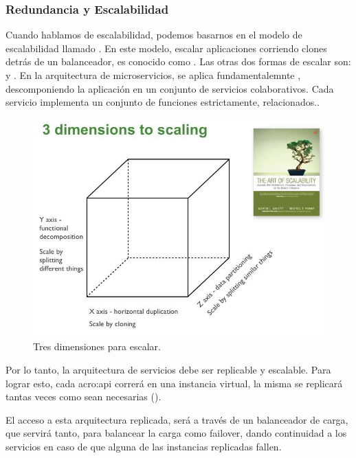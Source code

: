 \subsubsection{Redundancia y Escalabilidad}


Cuando hablamos de escalabilidad, podemos basarnos en el modelo de escalabilidad llamado .
En este modelo, escalar aplicaciones corriendo clones detrás de un balanceador, es conocido como .  Las otras dos formas de escalar son:  y .
En la arquitectura de microservicios, se aplica fundamentalemnte , descomponiendo la aplicación en un conjunto de servicios colaborativos.  Cada servicio implementa un conjunto de funciones estrictamente, relacionados.\cite{website:akfpartners-scale-cube}.

\begin{figure}
  \includegraphics[width=\linewidth]{src/images/03-capitulo-3/scale_cube.jpg}
  \caption{Tres dimensiones para escalar.}
  \label{fig:scale-cube}
\end{figure}

Por lo tanto, la arquitectura de servicios debe ser replicable y escalable.  Para lograr esto, cada \gls{acro:api} correrá en una instancia virtual, la misma se replicará tantas veces como sean necesarias ().

El acceso a esta arquitectura replicada, será a través de un balanceador de carga, que servirá tanto, para balancear la carga como failover, dando continuidad a los servicios en caso de que alguna de las instancias replicadas fallen.

